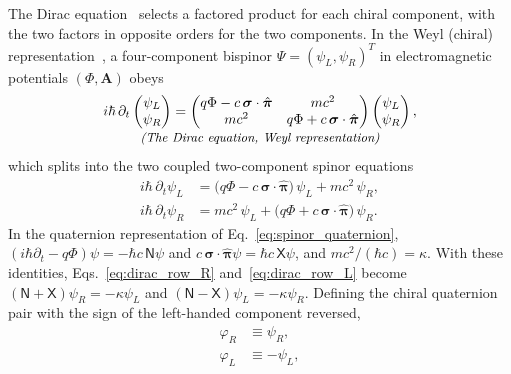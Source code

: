 \documentclass[aps,prd,onecolumn,tightenlines,nofootinbib,notitlepage,11pt,floatfix]{revtex4-2}
\theoremstyle{indentedtheorem}
\begin{document}
The Dirac equation~\citep{Dirac1928Quantum} selects a factored product for each chiral component, with the two factors in opposite orders for the two components. In the Weyl (chiral) representation~\citep{Peskin1995Introduction}, a four-component bispinor $\Psi = (\psi_L,\psi_R)^T$ in electromagnetic potentials $(\Phi,\mathbf{A})$ obeys
\begin{equation}
    \begin{gathered}
    i\hbar\,\partial_t \begin{pmatrix}\psi_L\\ \psi_R\end{pmatrix} = \begin{pmatrix} q\Phi - c\,\boldsymbol{\sigma}\cdot\hat{\boldsymbol{\pi}} & mc^2 \\ mc^2 & q\Phi + c\,\boldsymbol{\sigma}\cdot\hat{\boldsymbol{\pi}} \end{pmatrix} \begin{pmatrix}\psi_L\\ \psi_R\end{pmatrix} , \\[-3pt]
    \text{\small\itshape (The Dirac equation, Weyl representation)}
    \end{gathered}
    \label{eq:dirac_equation}
\end{equation}
which splits into the two coupled two-component spinor equations
\begin{align}
    i\hbar\,\partial_t\psi_L &= \big(q\Phi - c\,\boldsymbol{\sigma}\cdot\hat{\boldsymbol{\pi}}\big)\,\psi_L + mc^2\,\psi_R , \label{eq:dirac_row_L} \\
    i\hbar\,\partial_t\psi_R &= mc^2\,\psi_L + \big(q\Phi + c\,\boldsymbol{\sigma}\cdot\hat{\boldsymbol{\pi}}\big)\,\psi_R . \label{eq:dirac_row_R}
\end{align}
In the quaternion representation of Eq.~\eqref{eq:spinor_quaternion}, $(i\hbar\partial_t - q\Phi)\psi = -\hbar c\,\mathsf{N}\psi$ and $c\,\boldsymbol{\sigma}\cdot\hat{\boldsymbol{\pi}}\psi = \hbar c\,\mathsf{X}\psi$, and $mc^2/(\hbar c)=\kappa$. With these identities, Eqs.~\eqref{eq:dirac_row_R} and~\eqref{eq:dirac_row_L} become $(\mathsf{N}+\mathsf{X})\psi_R = -\kappa\psi_L$ and $(\mathsf{N}-\mathsf{X})\psi_L = -\kappa\psi_R$. Defining the chiral quaternion pair with the sign of the left-handed component reversed,
\begin{align}
    \varphi_R &\equiv \psi_R , \nonumber \\
    \varphi_L &\equiv -\psi_L ,
    \label{eq:chiral_components}
\end{align}
\end{document}
